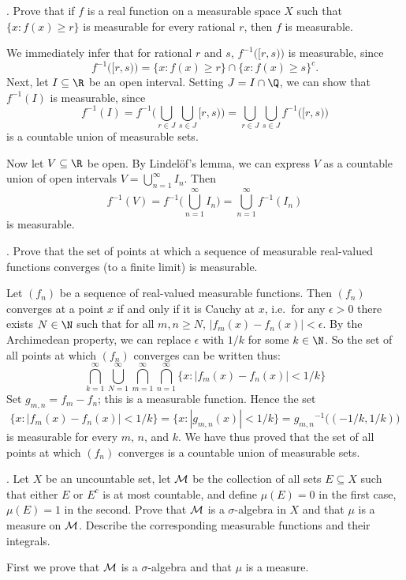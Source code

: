 . Prove that if $f$ is a real function on a measurable space $X$ such that $\{x:f(x)\geq r\}$ is measurable for every rational $r$, then $f$ is measurable.

\proof We immediately infer that for rational $r$ and $s$, $f^{-1}\big([r,s)\big)$ is measurable, since
$$f^{-1}\big([r,s)\big) = \{ x : f(x)\geq r\} \cap \{ x : f(x) \geq s\}^c.$$
Next, let $I\subseteq \R$ be an open interval. Setting $J = I\cap \Q$, we can show that $f^{-1}(I)$ is measurable, since
$$f^{-1}(I) = f^{-1}\bigg(\bigcup_{r\in J}\bigcup_{s\in J} [r,s)\bigg) = \bigcup_{r\in J}\bigcup_{s\in J} f^{-1}\big([r,s)\big)$$
is a countable union of measurable sets.

Now let $V\subseteq \R$ be open. By Lindel\"of's lemma, we can express $V$ as a countable union of open intervals $V=\bigcup_{n=1}^\infty I_n$. Then
$$f^{-1}(V) = f^{-1}\bigg(\bigcup_{n=1}^\infty I_n\bigg) = \bigcup_{n=1}^\infty f^{-1}(I_n)$$
is measurable.\slug

. Prove that the set of points at which a sequence of measurable real-valued functions converges (to a finite limit) is measurable.

\proof Let $(f_n)$ be a sequence of real-valued measurable functions. Then $(f_n)$ converges at a point $x$ if and only if it is Cauchy at $x$, i.e.\ for any $\epsilon > 0$ there exists $N\in \N$ such that for all $m,n\geq N$, $|f_m(x) - f_n(x)| < \epsilon$. By the Archimedean property, we can replace $\epsilon$ with $1/k$ for some $k\in \N$. So the set of all points at which $(f_n)$ converges can be written thus:
$$\bigcap_{k=1}^\infty \bigcup_{N=1}^\infty \bigcap_{m=1}^\infty \bigcap_{n=1}^\infty \big\{x : |f_m(x) - f_n(x)| < 1/k\big\}$$
Set $g_{m,n} = f_m - f_n$; this is a measurable function. Hence the set
$$\big\{x : |f_m(x) - f_n(x)| < 1/k\big\} = \big\{x : |g_{m,n}(x)| < 1/k\big\} = {g_{m,n}}^{-1}\big((-1/k, 1/k)\big)$$
is measurable for every $m$, $n$, and $k$. We have thus proved that the set of all points at which $(f_n)$ converges is a countable union of measurable sets.\slug

. Let $X$ be an uncountable set, let ${\cal M}$ be the collection of all sets $E\subseteq X$ such that either $E$ or $E^c$ is at most countable, and define $\mu(E) = 0$ in the first case, $\mu(E) = 1$ in the second. Prove that ${\cal M}$ is a $\sigma$-algebra in $X$ and that $\mu$ is a measure on ${\cal M}$. Describe the corresponding measurable functions and their integrals.

\noindent First we prove that ${\cal M}$ is a $\sigma$-algebra and that $\mu$ is a measure.

